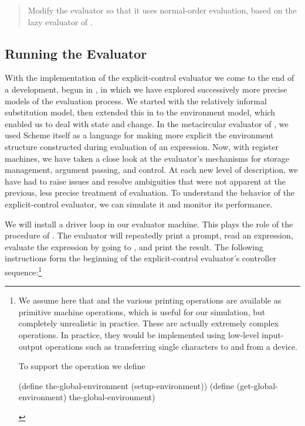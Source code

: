 \begin{quote}
 Modify the evaluator so that it
uses normal-order evaluation, based on the lazy evaluator of .
\end{quote}

\subsection{Running the Evaluator}
\label{Section 5.4.4}

With the implementation of the explicit-control evaluator we come to the end of
a development, begun in , in which we have explored successively
more precise models of the evaluation process.  We started with the relatively
informal substitution model, then extended this in  to the
environment model, which enabled us to deal with state and change.  In the
metacircular evaluator of , we used Scheme itself as a language
for making more explicit the environment structure constructed during
evaluation of an expression.  Now, with register machines, we have taken a
close look at the evaluator's mechanisms for storage management, argument
passing, and control.  At each new level of description, we have had to raise
issues and resolve ambiguities that were not apparent at the previous, less
precise treatment of evaluation.  To understand the behavior of the
explicit-control evaluator, we can simulate it and monitor its performance.

We will install a driver loop in our evaluator machine.  This plays the role of
the  procedure of .  The evaluator will
repeatedly print a prompt, read an expression, evaluate the expression by going
to , and print the result.  The following instructions form
the beginning of the explicit-control evaluator's controller
sequence:\footnote{We assume here that  and the various printing
operations are available as primitive machine operations, which is useful for
our simulation, but completely unrealistic in practice.  These are actually
extremely complex operations.  In practice, they would be implemented using
low-level input-output operations such as transferring single characters to and
from a device.

To support the  operation we define

\begin{smallscheme}
(define the-global-environment (setup-environment))
(define (get-global-environment) the-global-environment)
\end{smallscheme}
}

